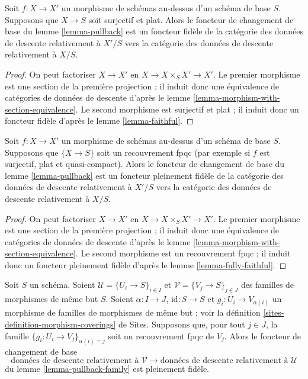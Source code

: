 \begin{lemma}
\label{lemma-morphism-source-faithfully-flat}
Soit $f : X \to X'$ un morphisme de schémas au-dessus d'un schéma de base
$S$. Supposons que $X \to S$ soit surjectif et plat. Alors le foncteur de
changement de base du lemme \ref{lemma-pullback} est un foncteur fidèle de la
catégorie des données de descente relativement à $X'/S$ vers la catégorie des
données de descente relativement à $X/S$.
\end{lemma}

\begin{proof}
On peut factoriser $X \to X'$ en
$X \to X \times_S X' \to X'$. Le premier morphisme est une section de la
première projection ; il induit donc une équivalence de catégories de données
de descente d'après le
lemme \ref{lemma-morphism-with-section-equivalence}. Le second morphisme est
surjectif et plat ; il induit donc un foncteur fidèle d'après le
lemme \ref{lemma-faithful}.
\end{proof}

\begin{lemma}
\label{lemma-morphism-source-fpqc-covering}
Soit $f : X \to X'$ un morphisme de schémas au-dessus d'un schéma de base
$S$. Supposons que $\{X \to S\}$ soit un recouvrement fpqc (par exemple si
$f$ est surjectif, plat et quasi-compact). Alors le foncteur de changement de
base du lemme \ref{lemma-pullback} est un foncteur pleinement fidèle de la
catégorie des données de descente relativement à $X'/S$ vers la catégorie des
données de descente relativement à $X/S$.
\end{lemma}

\begin{proof}
On peut factoriser $X \to X'$ en
$X \to X \times_S X' \to X'$. Le premier morphisme est une section de la
première projection ; il induit donc une équivalence de catégories de données
de descente d'après le
lemme \ref{lemma-morphism-with-section-equivalence}. Le second morphisme est un
recouvrement fpqc ; il induit donc un foncteur pleinement fidèle d'après le
lemme \ref{lemma-fully-faithful}.
\end{proof}

\begin{lemma}
\label{lemma-fpqc-refinement-coverings-fully-faithful}
Soit $S$ un schéma. Soient
$\mathcal{U} = \{U_i \to S\}_{i \in I}$ et
$\mathcal{V} = \{V_j \to S\}_{j \in J}$ des familles de morphismes de même
but $S$. Soient $\alpha : I \to J$, $\text{id} : S \to S$ et
$g_i : U_i \to V_{\alpha(i)}$ un morphisme de familles de morphismes de même
but ; voir la définition \ref{sites-definition-morphism-coverings} de Sites.
Supposons que, pour tout $j \in J$, la famille
$\{g_i : U_i \to V_j\}_{\alpha(i) = j}$ soit un recouvrement fpqc de $V_j$.
Alors le foncteur de changement de base
$$
\text{données de descente relativement à }
\mathcal{V}
\longrightarrow
\text{données de descente relativement à }
\mathcal{U}
$$
du lemme \ref{lemma-pullback-family} est pleinement fidèle.
\end{lemma}

